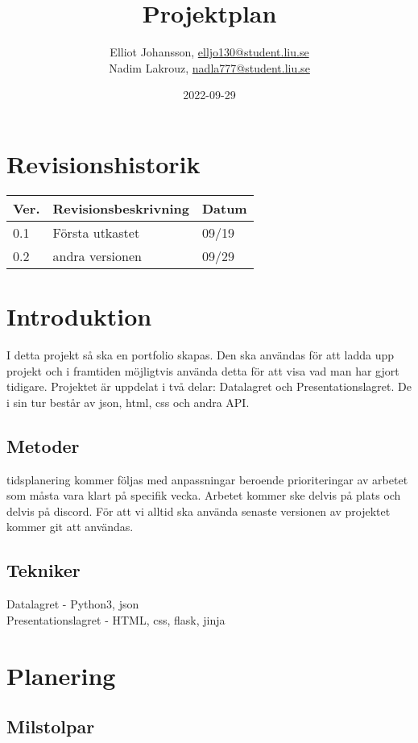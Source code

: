 \documentclass{TDP003mall}
\author{Elliot Johansson, \url{elljo130@student.liu.se}\\
  Nadim Lakrouz, \url{nadla777@student.liu.se}}
\title{Projektplan}
\date{2022-09-29}
\begin{document}
\projectpage
\section{Revisionshistorik}
\begin{table}[!h]
\begin{tabularx}{\linewidth}{|l|X|l|}
\hline
Ver. & Revisionsbeskrivning & Datum \\\hline
0.1 & Första utkastet &  09/19\\\hline
0.2 & andra versionen & 09/29 \\\hline
\end{tabularx}
\end{table}


\section{Introduktion}
I detta projekt så ska en portfolio skapas. Den ska användas för att ladda upp projekt och i framtiden möjligtvis använda detta för att visa vad man har gjort tidigare. Projektet är uppdelat i två delar: Datalagret och Presentationslagret. De i sin tur består av json, html, css och andra API. 



\subsection{Metoder}
tidsplanering kommer följas med anpassningar beroende prioriteringar av arbetet som måsta vara klart på specifik vecka. Arbetet kommer ske delvis på plats och delvis på discord. För att vi alltid ska använda senaste versionen av projektet kommer git att användas.

\subsection{Tekniker}

Datalagret - Python3, json \\
Presentationslagret - HTML, css, flask, jinja

\section{Planering}

\subsection{Milstolpar}
\end{document}
